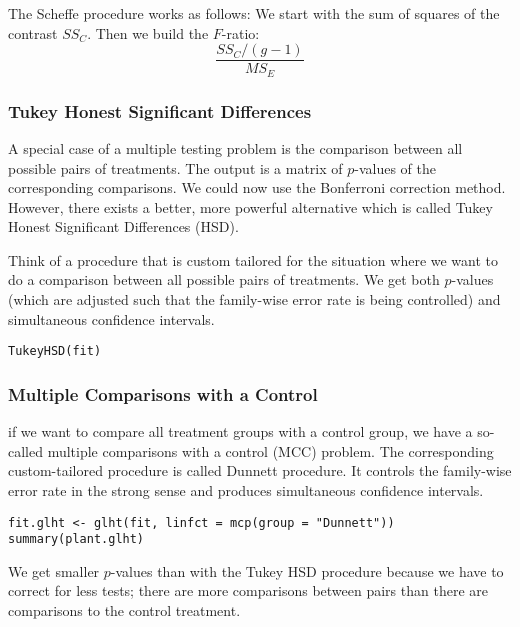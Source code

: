 The Scheffe procedure works as follows: We start with the sum of squares of the contrast $SS_C$. Then we build the $F$-ratio:
$$\frac{SS_C/(g-1)}{MS_E}$$

\subsubsection{Tukey Honest Significant Differences}

A special case of a multiple testing problem is the comparison between all possible pairs of treatments. The output is a matrix of $p$-values of the corresponding comparisons. We could now use the Bonferroni correction method. However, there exists a better, more powerful alternative which is called Tukey Honest Significant Differences (HSD). \medskip

Think of a procedure that is custom tailored for the situation where we want to do a comparison between all possible pairs of treatments. We get both $p$-values (which are adjusted such that the family-wise error rate is being controlled) and simultaneous confidence intervals.
\begin{lstlisting}
TukeyHSD(fit)
\end{lstlisting}


\subsubsection{Multiple Comparisons with a Control}

 if we want to compare all treatment groups with a control group, we have a so-called multiple comparisons with a control (MCC) problem. The corresponding custom-tailored procedure is called Dunnett procedure. It controls the family-wise error rate in the strong sense and produces simultaneous confidence intervals. 
 
\begin{lstlisting}
fit.glht <- glht(fit, linfct = mcp(group = "Dunnett"))
summary(plant.glht)
\end{lstlisting}

 We get smaller $p$-values than with the Tukey HSD procedure because we have to correct for less tests; there are more comparisons between pairs than there are comparisons to the control treatment.
